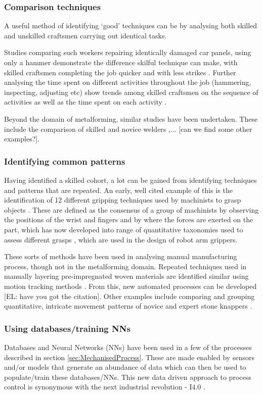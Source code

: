 \subsubsection{Comparison techniques} 
A useful method of identifying `good' techniques can be by analysing both skilled and unskilled craftsmen carrying out identical tasks. 

Studies comparing such workers repairing identically damaged car panels, using only a hammer demonstrate the difference skilful technique can make, with skilled craftsmen completing the job quicker and with less strikes \citep{Ikemoto2016}. Further analysing the time spent on different activities throughout the job (hammering, inspecting, adjusting etc) show trends among skilled craftsmen on the sequence of activities as well as the time spent on each activity \citep{Takai2020}. 

Beyond the domain of metalforming, similar studies have been undertaken. These include the comparison of skilled and novice welders \citep{Manorathna2017},... [can we find some other examples?].

\subsubsection{Identifying common patterns}
Having identified a skilled cohort, a lot can be gained from identifying techniques and patterns that are repeated. An early, well cited example of this is the identification of 12 different gripping techniques used by machinists to grasp objects \citep{cutkosky1986modeling}. These are defined as the consensus of a group of machinists by observing the positions of the wrist and fingers and by where the forces are exerted on the part, which has now developed into range of quantitative taxonomies used to assess different grasps \citep{Feix2016}, which are used in the design of robot arm grippers.

These sorts of methods have been used in analysing manual manufacturing process, though not in the metalforming domain. Repeated techniques used in manually layering pre-impregnated woven materials are identified similar using motion tracking methods \citep{Kikuchi2014, Elkington2015}. From this, new automated processes can be developed [EL: have you got the citation]. Other examples include comparing and grouping quantitative, intricate movement patterns of novice and expert stone knappers \citep{Rein2014}.  

\subsubsection{Using databases/training NNs}
Databases and Neural Networks (NNs) have been used in a few of the processes described in section \ref{sec:MechanisedProcess}. These are made enabled by sensors and/or models that generate an abundance of data which can then be used to populate/train these databases/NNs. This new data driven approach to process control is synonymous with the next industrial revolution - I4.0 \citep{ZHONG2017616}. %


